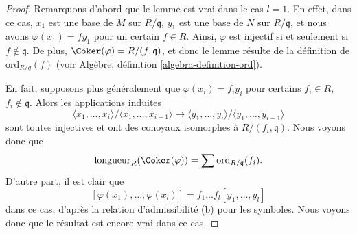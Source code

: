 \begin{proof}
Remarquons d'abord que le lemme est vrai dans le cas $l = 1$.
En effet, dans ce cas, $x_1$ est une base de $M$ sur $R/\mathfrak q$,
$y_1$ est une base de $N$ sur $R/\mathfrak q$, et nous avons
$\varphi(x_1) = fy_1$ pour un certain $f \in R$. Ainsi, $\varphi$ est injectif
si et seulement si $f \not \in \mathfrak q$. De plus,
$\Coker(\varphi) = R/(f, \mathfrak q)$, et donc le lemme
résulte de la définition de $\text{ord}_{R/q}(f)$
(voir Algèbre, définition \ref{algebra-definition-ord}).

\medskip\noindent
En fait, supposons plus généralement que $\varphi(x_i) = f_iy_i$ pour certains
$f_i \in R$, $f_i \not \in \mathfrak q$. Alors les applications induites
$$
\langle x_1, \ldots, x_i\rangle / \langle x_1, \ldots, x_{i - 1}\rangle
\longrightarrow
\langle y_1, \ldots, y_i\rangle / \langle y_1, \ldots, y_{i - 1}\rangle
$$
sont toutes injectives et ont des conoyaux isomorphes à
$R/(f_i, \mathfrak q)$. Nous voyons donc que
$$
\text{longueur}_R(\Coker(\varphi)) = \sum \text{ord}_{R/\mathfrak q}(f_i).
$$
D'autre part, il est clair que
$$
[\varphi(x_1), \ldots, \varphi(x_l)] = f_1 \ldots f_l [y_1, \ldots, y_l]
$$
dans ce cas, d'après la relation d'admissibilité (b) pour les symboles.
Nous voyons donc que le résultat est encore vrai dans ce cas.


\end{proof}
